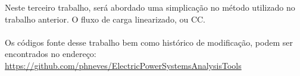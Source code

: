 \documentclass[Portugues,Final]{tese-FT}
\begin{document}
\paginasiniciais
\begin{resumo}

Neste terceiro trabalho, será abordado uma simplicação no método utilizado no trabalho anterior. O fluxo de carga linearizado, ou CC.\\\\
Os códigos fonte desse trabalho bem como histórico de modificação, podem ser encontrados no endereço: \href{https://github.com/phneves/ElectricPowerSystemsAnalysisTools}{https://github.com/phneves/ElectricPowerSystemsAnalysisTools}



\end{resumo}


%

\renewcommand{\nomname}{Lista de Abreviações e Siglas}
\printnomenclature[3cm]


\tableofcontents
\fimdaspaginasiniciais


%
%










%

%

\begin{singlespacing}
\setlength\bibitemsep{10pt}   %
\printbibliography[heading=bibintoc, %
                   title={Referências bibliográficas} %
                  ]
\end{singlespacing}


%
\end{document}
